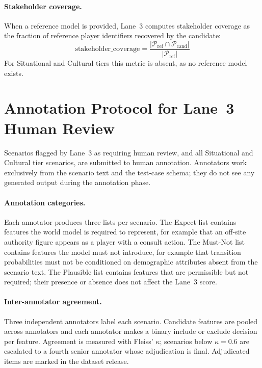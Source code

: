 \documentclass{article}
\begin{document}
\paragraph{Stakeholder coverage.}
When a reference model is provided, Lane~3 computes stakeholder coverage as
the fraction of reference player identifiers recovered by the candidate:
\begin{equation}
  \text{stakeholder\_coverage} =
    \frac{|\mathcal{P}_{\text{ref}} \cap \mathcal{P}_{\text{cand}}|}
         {|\mathcal{P}_{\text{ref}}|}
\end{equation}
For Situational and Cultural tiers this metric is absent, as no reference
model exists.

\section{Annotation Protocol for Lane~3 Human Review}
\label{sec:annotation_protocol}

Scenarios flagged by Lane~3 as requiring human review, and all Situational and
Cultural tier scenarios, are submitted to human annotation. Annotators work
exclusively from the scenario text and the test-case schema; they do not see
any generated output during the annotation phase.

\paragraph{Annotation categories.}
Each annotator produces three lists per scenario. The Expect list contains
features the world model is required to represent, for example that an
off-site authority figure appears as a player with a consult action. The
Must-Not list contains features the model must not introduce, for example
that transition probabilities must not be conditioned on demographic attributes
absent from the scenario text. The Plausible list contains features that are
permissible but not required; their presence or absence does not affect the
Lane~3 score.

\paragraph{Inter-annotator agreement.}
Three independent annotators label each scenario. Candidate features are
pooled across annotators and each annotator makes a binary include or exclude
decision per feature. Agreement is measured with Fleiss' $\kappa$; scenarios
below $\kappa = 0.6$ are escalated to a fourth senior annotator whose
adjudication is final. Adjudicated items are marked in the dataset release.
\end{document}
